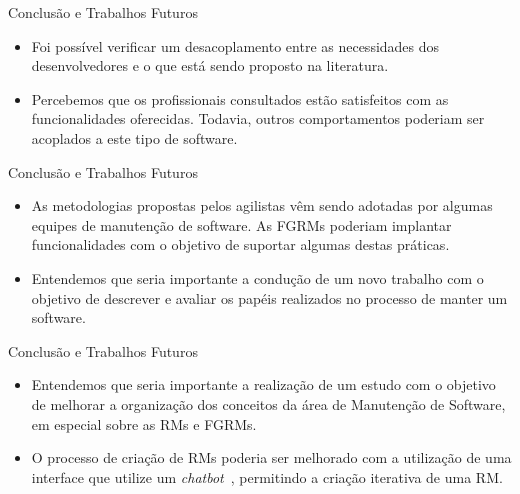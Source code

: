 \documentclass[t,14pt,mathserif]{beamer}
\begin{document}
\begin{frame}{Conclusão e Trabalhos Futuros}
    \begin{itemize}

        \item Foi possível verificar um desacoplamento entre as necessidades
            dos desenvolvedores e o que está sendo proposto na literatura.

        \item Percebemos que os profissionais consultados estão satisfeitos com
            as funcionalidades oferecidas. Todavia, outros comportamentos
            poderiam ser acoplados a este tipo de software.
    \end{itemize}
\end{frame}

\begin{frame}{Conclusão e Trabalhos Futuros}
    \begin{itemize}

        \item  As metodologias propostas pelos agilistas vêm sendo adotadas por
            algumas equipes de manutenção de software. As FGRMs poderiam
            implantar funcionalidades com o objetivo de suportar algumas destas
            práticas.

        \item Entendemos que seria importante a condução de um novo trabalho com
            o objetivo de descrever e avaliar os papéis realizados no processo
            de manter um software.
    \end{itemize}
\end{frame}

\begin{frame}{Conclusão e Trabalhos Futuros}
    \begin{itemize}

        \item Entendemos que seria importante a realização de um estudo com o
            objetivo de melhorar a organização dos conceitos da área de
            Manutenção de Software, em especial sobre as RMs e FGRMs.

        \item O processo de criação de RMs poderia ser melhorado com a
            utilização de uma interface que utilize um
            \textit{chatbot}~\cite{mauldin1994chatterbots,huang2007extracting},
            permitindo a criação iterativa de uma RM\@.
    \end{itemize}
\end{frame}
\end{document}
